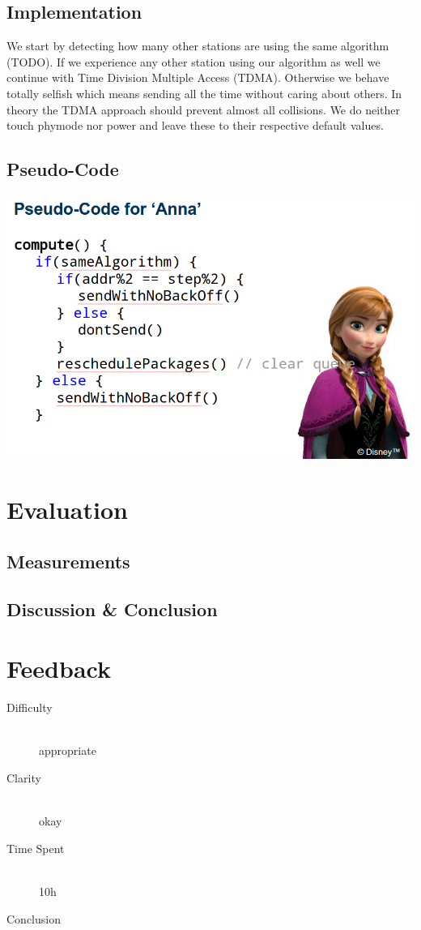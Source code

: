 \documentclass[12pt]{article}
\begin{document}
\subsection{Implementation}
We start by detecting how many other stations are using the same algorithm (TODO).
If we experience any other station using our algorithm as well we continue with Time Division Multiple Access (TDMA). Otherwise we behave totally selfish which means sending all the time without caring about others.
In theory the TDMA approach should prevent almost all collisions.
We do neither touch phymode nor power and leave these to their respective default values.

\subsection{Pseudo-Code}

\includegraphics[width=160mm]{img/pseudocode.png}


\section{Evaluation}

\subsection{Measurements}

\subsection{Discussion \& Conclusion}


\section{Feedback}

\begin{description}
  \item[Difficulty] \hfill \\ appropriate
  \item[Clarity] \hfill \\ okay
  \item[Time Spent] \hfill \\ 10h
  \item[Conclusion] \hfill \\ 
\end{description}
\end{document}
